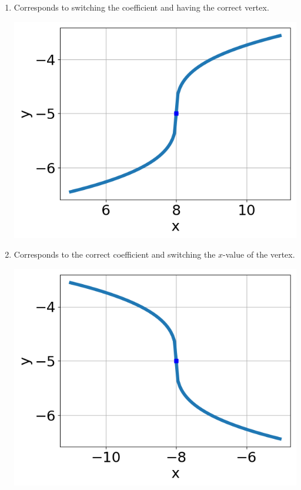 \documentclass{article}[10pt]
\begin{document}
\begin{enumerate}[label=\Alph*.]
\item Corresponds to switching the coefficient and having the correct vertex. 
\begin{center}\includegraphics[scale=0.5]{../Figures/question23CC.png}\end{center} 
 
\item Corresponds to the correct coefficient and switching the $x$-value of the vertex. 
\begin{center}\includegraphics[scale=0.5]{../Figures/question23CA.png}\end{center} 
 

\end{enumerate}
\end{document}
